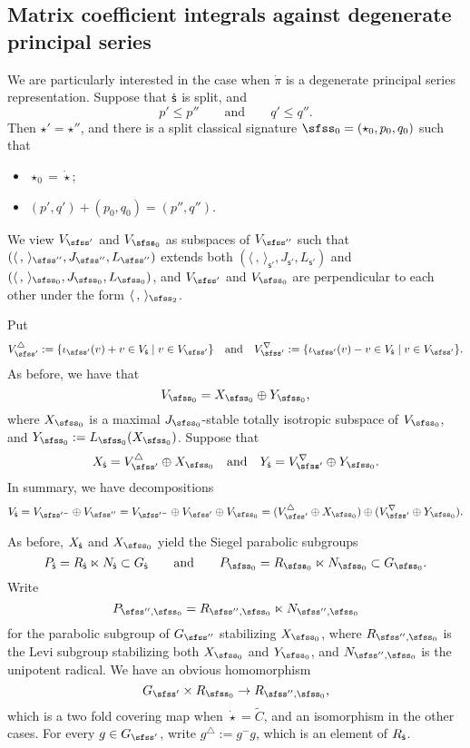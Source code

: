 \documentclass[12pt,a4paper]{amsart}
\newcommand{\la}{\langle}
\newcommand{\ra}{\rangle}
\newcommand{\be}{\begin {equation}}
\newcommand{\ee}{\end {equation}}
\numberwithin{equation}{section}
\theoremstyle{remark}
\begin{document}
\subsection{Matrix coefficient integrals against degenerate principal series}
\label{sec:DP}

We are particularly interested in the case when $\dot \pi$ is a degenerate principal series representation.
Suppose that ${\dot{\mathsf s}}$ is split,  and
\[
  p'\leq p''\qquad\textrm{and}\qquad q'\leq q''.
\]
Then $\star'=\star''$, and there is a  split classical signature $\sfss_0=(\star_0, p_0, q_0)$ such that
\begin{itemize}
\item $\star_0=\dot \star$;
  \item $(p', q')+(p_0, q_0)=(p'', q'')$.
\end{itemize}
We view $V_{\sfss'}$  and $V_{\sfss_0}$ as subspaces of $V_{\sfss''}$ such that $(\la\,,\,\ra_{\sfss''}, J_{\sfss''},L_{\sfss''})$  extends  both $(\la\,,\,\ra_{\mathsf s'}, J_{\mathsf s'}, L_{\mathsf s'})$ and $(\la\,,\,\ra_{\sfss_0}, J_{\sfss_0},L_{\sfss_0})$, and  $V_{\sfss'}$  and $V_{\sfss_0}$ are perpendicular to each other under the form $\la\, ,\,\ra_{\sfss_2}$.


Put
\[
   V_{\sfss'}^\triangle:=\{\iota_{\sfss'}(v)+v\in V_\dsfss \mid v\in V_{\sfss'}\}\quad\textrm{and}\quad V_{\sfss'}^\nabla:=\{\iota_{\sfss'}(v)-v\in V_\dsfss \mid v\in V_{\sfss'}\}.
 \]
As before, we have that
\[
  V_{\sfss_0}=X_{\sfss_0}\oplus Y_{\sfss_0},
\]
where $X_{\sfss_0}$ is a maximal $J_{\sfss_0}$-stable totally isotropic subspace of $V_{\sfss_0}$, and $Y_{\sfss_0}:=L_{\sfss_0}(X_{\sfss_0})$.
Suppose that
 \[
 X_{\dsfss}= V_{\sfss'}^\triangle \oplus X_{\sfss_0}\quad\textrm{and}\quad Y_{\dsfss}=V_{\sfss'}^\nabla \oplus Y_{\sfss_0}.
 \]
In summary, we have decompositions
\be\label{decomv0}
  V_{\dsfss}=V_{\sfss'^-}\oplus V_{\sfss''}= V_{\sfss'^-}\oplus V_{\sfss'}\oplus  V_{\sfss_0}= (V_{\sfss'}^\triangle \oplus X_{\sfss_0})\oplus (V_{\sfss'}^\nabla \oplus Y_{\sfss_0}).
\ee

As before, $X_{\dot{\mathsf s}}$ and $X_{\sfss_0}$ yield
 the Siegel parabolic subgroups
 \[
  P_{\dsfss}=R_{\dsfss}\ltimes N_\dsfss\subset G_\dsfss\qquad \textrm{and}\qquad P_{\sfss_0}=R_{\sfss_0}\ltimes N_{\sfss_0}\subset G_{\sfss_0}.
 \]
 Write
\be\label{parabolic} 
  P_{\sfss'',\sfss_0}=R_{\sfss'',\sfss_0}\ltimes N_{\sfss'',\sfss_0}
\ee
for the parabolic subgroup of $G_{\sfss''}$ stabilizing $X_{\sfss_0}$, where $R_{\sfss'',\sfss_0}$ is the Levi subgroup stabilizing both $X_{\sfss_0}$ and $Y_{\sfss_0}$, and $N_{\sfss'',\sfss_0}$ is the unipotent radical. We have an obvious homomorphism
\be  \label{parabolic2}
  G_{\sfss'}\times R_{\sfss_0}\rightarrow R_{\sfss'',\sfss_0},
\ee
which is a two fold covering map when $\dot \star=\widetilde C$, and an isomorphism in the other cases.
For every $g\in G_{\sfss'}$, write $g^\triangle:= g^- g$, which is an element of $R_{{\dot{\mathsf s}}}$.
\end{document}
